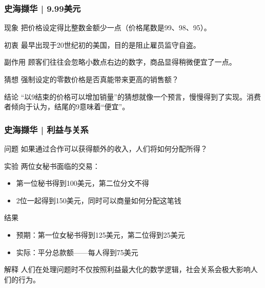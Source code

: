 \begin{frame}
  \frametitle{史海撷华 | 9.99美元}
  \begin{block}{现象}
    把价格设定得比整数金额少一点（价格尾数是99、98、95）。
  \end{block}
  \pause
  \begin{block}{初衷}
    最早出现于20世纪初的美国，目的是阻止雇员监守自盗。
  \end{block}
  \pause
  \begin{block}{副作用}
    顾客们往往会忽略小数点右边的数字，商品显得稍微便宜了一点。
  \end{block}
  \pause
  \begin{block}{猜想}
    强制设定的零数价格是否真能带来更高的销售额？
  \end{block}
  \pause
  \begin{block}{结论}
    “以9结束的价格可以增加销量”的猜想就像一个预言，慢慢得到了实现。消费者倾向于认为，结尾的9意味着“便宜”。
  \end{block}
\end{frame}

\begin{frame}
  \frametitle{史海撷华 | 利益与关系}
  \begin{block}{问题}
    如果通过合作可以获得额外的收入，人们将如何分配所得？
  \end{block}
  \vspace{-0.5em}
  \pause
  \begin{block}{实验}
    两位女秘书面临的交易：
    \begin{itemize}
      \item 第一位秘书得到100美元，第二位分文不得
      \item 2位一起得到150美元，同时可以商量如何分配这笔钱
    \end{itemize}
  \end{block}
  \vspace{-0.5em}
  \pause
  \begin{block}{结果}
    \begin{itemize}
      \item 预期：第一位女秘书得到125美元，第二位得到25美元
      \item 实际：平分总款额——每人得到75美元
    \end{itemize}
  \end{block}
  \vspace{-0.5em}
  \pause
  \begin{block}{解释}
    人们在处理问题时不仅按照利益最大化的数学逻辑，\alert{社会关系会极大影响人们的行为}。
  \end{block}
\end{frame}

